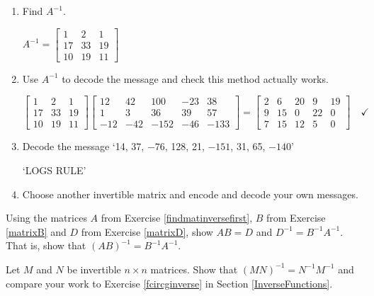 \documentclass{ximera}
\begin{document}
\begin{problem}
\begin{enumerate}

\item  Find $A^{-1}$.

\begin{solution}
$A^{-1} = \left[ \begin{array}{rrr} 1 & 2 & 1 \\ 17 & 33 & 19 \\ 10 & 19 & 11 \end{array} \right] $
\end{solution}

\item  Use $A^{-1}$ to decode the message and check this method actually works.

\begin{solution}
$ \left[ \begin{array}{rrr} 1 & 2 & 1 \\ 17 & 33 & 19 \\ 10 & 19 & 11 \end{array} \right] \left[  \begin{array}{rrrrr} 12 & 42 & 100 & -23 & 38 \\ 1 & 3 & 36 & 39 & 57 \\ -12 & -42 & -152 & -46 & -133 \end{array} \right] =  \left[  \begin{array}{rrrrr} 2 & 6 & 20 & 9 & 19 \\ 9 & 15 & 0 & 22 & 0 \\ 7 & 15 & 12 & 5 & 0 \end{array} \right] \quad \checkmark$
\end{solution}

\item  Decode the message `14, 37, $-76$, 128, 21, $-151$, 31, 65, $-140$'

\begin{solution}
`LOGS RULE'
\end{solution}

\item  Choose another invertible matrix and encode and decode your own messages.

\end{enumerate}
\end{problem}

\begin{problem}
Using the matrices $A$ from Exercise \ref{findmatinversefirst}, $B$ from Exercise \ref{matrixB} and $D$ from Exercise \ref{matrixD}, show $AB = D$ and  $D^{-1} = B^{-1}A^{-1}$.  That is, show that $(AB)^{-1} = B^{-1}A^{-1}$.
\end{problem}

\begin{problem}
Let $M$ and $N$ be invertible $n \times n$ matrices.  Show that $(MN)^{-1} = N^{-1}M^{-1}$ and compare your work to Exercise \ref{fcircginverse} in Section \ref{InverseFunctions}.
\end{problem}
\end{document}
